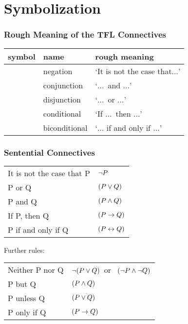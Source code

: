 \vfill

\section{Symbolization}
\subsubsection*{Rough Meaning of the TFL Connectives}
		\begin{tabular}{cll}
		\textbf{symbol}&\textbf{name}&\textbf{rough meaning}\\
		\hline
		\enot&negation&`It is not the case that$\ldots$'\\
		\eand&conjunction&`$\ldots$\ and $\ldots$'\\
		\eor&disjunction&`$\ldots$\ or $\ldots$'\\
		\eif&conditional&`If $\ldots$\ then $\ldots$'\\
		\eiff&biconditional&`$\ldots$ if and only if $\ldots$'\\
		\end{tabular}
		
		

\label{app.symbolization}
\subsubsection*{Sentential Connectives}
\begin{center}\begin{tabular*}{\textwidth}{ll}
It is not the case that P & $\neg P$\\
P or Q & $(P \vee Q)$\\
P and Q & $(P \wedge Q)$\\
If P, then Q & $(P \rightarrow Q)$\\
P if and only if Q & $(P \leftrightarrow Q)$\\
\end{tabular*}\end{center}Further rules:\begin{center}
\begin{tabular*}{\textwidth}{ll}
Neither P nor Q & $\neg(P \vee Q)$\ or \ $(\neg P \wedge \neg Q)$\\
P but Q & $(P \wedge Q)$\\
P unless Q & $(P \vee Q)$\\
P only if Q & $(P \rightarrow Q)$
\end{tabular*}
\end{center}
